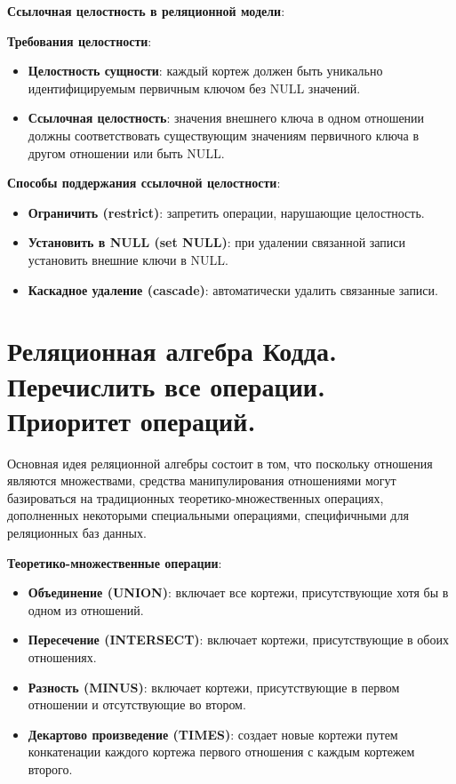 \documentclass[a4paper,12pt]{article}
\begin{document}
\textbf{Ссылочная целостность в реляционной модели}:

\textbf{Требования целостности}:

\begin{itemize}
    \item \textbf{Целостность сущности}: каждый кортеж должен быть уникально идентифицируемым первичным ключом без NULL значений.
    \item \textbf{Ссылочная целостность}: значения внешнего ключа в одном отношении должны соответствовать существующим значениям первичного ключа в другом отношении или быть NULL.
\end{itemize}

\textbf{Способы поддержания ссылочной целостности}:

\begin{itemize}
    \item \textbf{Ограничить (restrict)}: запретить операции, нарушающие целостность.
    \item \textbf{Установить в NULL (set NULL)}: при удалении связанной записи установить внешние ключи в NULL.
    \item \textbf{Каскадное удаление (cascade)}: автоматически удалить связанные записи.
\end{itemize}

\section{Реляционная алгебра Кодда. Перечислить все операции. Приоритет операций.}

Основная идея реляционной алгебры состоит в том, что поскольку отношения являются множествами, средства манипулирования отношениями могут базироваться на традиционных теоретико-множественных операциях, дополненных некоторыми специальными операциями, специфичными для реляционных баз данных.

\textbf{Теоретико-множественные операции}:

\begin{itemize}
    \item \textbf{Объединение (UNION)}: включает все кортежи, присутствующие хотя бы в одном из отношений.
    \item \textbf{Пересечение (INTERSECT)}: включает кортежи, присутствующие в обоих отношениях.
    \item \textbf{Разность (MINUS)}: включает кортежи, присутствующие в первом отношении и отсутствующие во втором.
    \item \textbf{Декартово произведение (TIMES)}: создает новые кортежи путем конкатенации каждого кортежа первого отношения с каждым кортежем второго.
\end{itemize}
\end{document}
